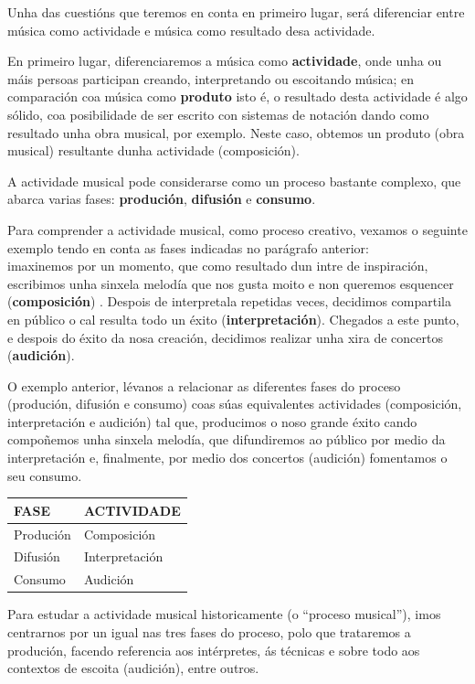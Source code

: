 \documentclass[a4paper, twoside]{templates/ociamthesis}
\begin{document}
Unha das cuestións que teremos en conta en primeiro lugar, será diferenciar entre música como actividade e música como resultado desa actividade.

En primeiro lugar, diferenciaremos a música como \textbf{actividade}, onde unha ou máis persoas participan creando, interpretando ou escoitando música; en comparación coa música como \textbf{produto} isto é, o resultado desta actividade é algo sólido, coa posibilidade de ser escrito con sistemas de notación dando como resultado unha obra musical, por exemplo. Neste caso, obtemos un produto (obra musical) resultante dunha actividade (composición).

A actividade musical pode considerarse como un proceso bastante complexo, que abarca varias fases: \textbf{produción}, \textbf{difusión} e \textbf{consumo}.

Para comprender a actividade musical, como proceso creativo, vexamos o seguinte exemplo tendo en conta as fases indicadas no parágrafo anterior:\\
imaxinemos por un momento, que como resultado dun intre de inspiración, escribimos unha sinxela melodía que nos gusta moito e non queremos esquencer (\textbf{composición}) . Despois de interpretala repetidas veces, decidimos compartila en público o cal resulta todo un éxito (\textbf{interpretación}). Chegados a este punto, e despois do éxito da nosa creación, decidimos realizar unha xira de concertos (\textbf{audición}).

O exemplo anterior, lévanos a relacionar as diferentes fases do proceso (produción, difusión e consumo) coas súas equivalentes actividades (composición, interpretación e audición) tal que, producimos o noso grande éxito cando compoñemos unha sinxela melodía, que difundiremos ao público por medio da interpretación e, finalmente, por medio dos concertos (audición) fomentamos o seu consumo.

\begin{longtable}[]{@{}ll@{}}
\toprule
FASE & ACTIVIDADE \\
\midrule
\endhead
Produción & Composición \\
Difusión & Interpretación \\
Consumo & Audición \\
\bottomrule
\end{longtable}

Para estudar a actividade musical historicamente (o ``proceso musical''), imos centrarnos por un igual nas tres fases do proceso, polo que trataremos a produción, facendo referencia aos intérpretes, ás técnicas e sobre todo aos contextos de escoita (audición), entre outros.
\end{document}
